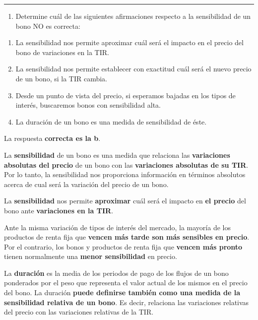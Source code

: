 \documentclass[
  letterpaper,
  DIV=11,
  numbers=noendperiod]{scrartcl}
\providecommand{\tightlist}{%
  \setlength{\itemsep}{0pt}\setlength{\parskip}{0pt}}\usepackage{longtable,booktabs,array}
\begin{document}
\begin{center}\rule{0.5\linewidth}{0.5pt}\end{center}

\begin{enumerate}
\def\labelenumi{\arabic{enumi}.}
\setcounter{enumi}{5}
\tightlist
\item
  Determine cuál de las siguientes afirmaciones respecto a la
  sensibilidad de un bono NO es correcta:
\end{enumerate}

\begin{enumerate}
\def\labelenumi{\alph{enumi}.}
\item
  La sensibilidad nos permite aproximar cuál será el impacto en el
  precio del bono de variaciones en la TIR.
\item
  La sensibilidad nos permite establecer con exactitud cuál será el
  nuevo precio de un bono, si la TIR cambia.
\item
  Desde un punto de vista del precio, si esperamos bajadas en los tipos
  de interés, buscaremos bonos con sensibilidad alta.
\item
  La duración de un bono es una medida de sensibilidad de éste.
\end{enumerate}

\begin{tcolorbox}[enhanced jigsaw, colframe=quarto-callout-note-color-frame, opacityback=0, colback=white, leftrule=.75mm, left=2mm, breakable, arc=.35mm, rightrule=.15mm, toprule=.15mm, bottomrule=.15mm]
\begin{minipage}[t]{5.5mm}
\textcolor{quarto-callout-note-color}{\faInfo}
\end{minipage}%
\begin{minipage}[t]{\textwidth - 5.5mm}

La respuesta \textbf{correcta es la b}.

La \textbf{sensibilidad} de un bono es una medida que relaciona las
\textbf{variaciones absolutas del precio} de un bono con las
\textbf{variaciones absolutas de su TIR}. Por lo tanto, la sensibilidad
nos proporciona información en términos absolutos acerca de cual será la
variación del precio de un bono.

La \textbf{sensibilidad} nos permite \textbf{aproximar} cuál será el
impacto en \textbf{el precio} del bono ante \textbf{variaciones en la
TIR}.

Ante la misma variación de tipos de interés del mercado, la mayoría de
los productos de renta fija que \textbf{vencen más tarde son más
sensibles en precio}. Por el contrario, los bonos y productos de renta
fija que \textbf{vencen más pronto} tienen normalmente una \textbf{menor
sensibilidad} en precio.

La \textbf{duración} es la media de los periodos de pago de los flujos
de un bono ponderados por el peso que representa el valor actual de los
mismos en el precio del bono. La duración \textbf{puede definirse
también como una medida de la sensibilidad relativa de un bono}. Es
decir, relaciona las variaciones relativas del precio con las
variaciones relativas de la TIR.

\end{minipage}%
\end{tcolorbox}
\end{document}
